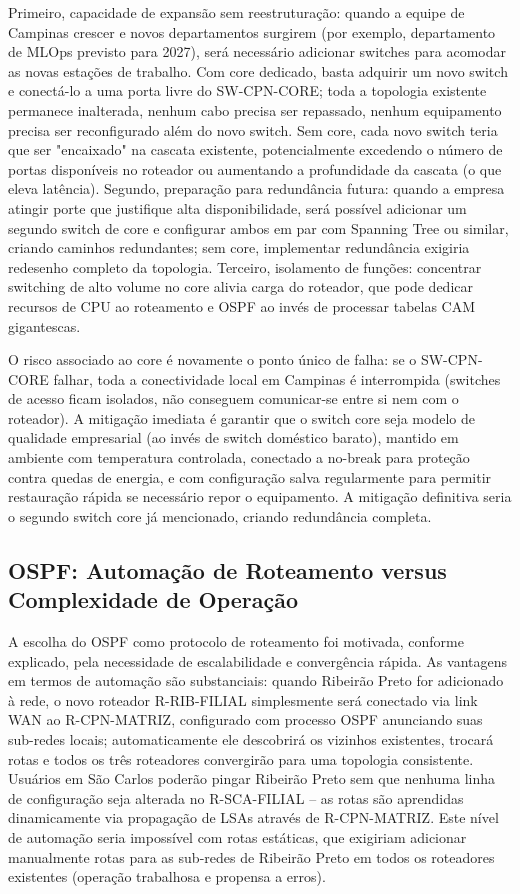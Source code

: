 \documentclass[12pt,a4paper]{article}
\begin{document}
Primeiro, capacidade de expansão sem reestruturação: quando a equipe de Campinas crescer e novos departamentos surgirem (por exemplo, departamento de MLOps previsto para 2027), será necessário adicionar switches para acomodar as novas estações de trabalho. Com core dedicado, basta adquirir um novo switch e conectá-lo a uma porta livre do SW-CPN-CORE; toda a topologia existente permanece inalterada, nenhum cabo precisa ser repassado, nenhum equipamento precisa ser reconfigurado além do novo switch. Sem core, cada novo switch teria que ser "encaixado" na cascata existente, potencialmente excedendo o número de portas disponíveis no roteador ou aumentando a profundidade da cascata (o que eleva latência). Segundo, preparação para redundância futura: quando a empresa atingir porte que justifique alta disponibilidade, será possível adicionar um segundo switch de core e configurar ambos em par com Spanning Tree ou similar, criando caminhos redundantes; sem core, implementar redundância exigiria redesenho completo da topologia. Terceiro, isolamento de funções: concentrar switching de alto volume no core alivia carga do roteador, que pode dedicar recursos de CPU ao roteamento e OSPF ao invés de processar tabelas CAM gigantescas.

O risco associado ao core é novamente o ponto único de falha: se o SW-CPN-CORE falhar, toda a conectividade local em Campinas é interrompida (switches de acesso ficam isolados, não conseguem comunicar-se entre si nem com o roteador). A mitigação imediata é garantir que o switch core seja modelo de qualidade empresarial (ao invés de switch doméstico barato), mantido em ambiente com temperatura controlada, conectado a no-break para proteção contra quedas de energia, e com configuração salva regularmente para permitir restauração rápida se necessário repor o equipamento. A mitigação definitiva seria o segundo switch core já mencionado, criando redundância completa.

\subsection{OSPF: Automação de Roteamento versus Complexidade de Operação}

A escolha do OSPF como protocolo de roteamento foi motivada, conforme explicado, pela necessidade de escalabilidade e convergência rápida. As vantagens em termos de automação são substanciais: quando Ribeirão Preto for adicionado à rede, o novo roteador R-RIB-FILIAL simplesmente será conectado via link WAN ao R-CPN-MATRIZ, configurado com processo OSPF anunciando suas sub-redes locais; automaticamente ele descobrirá os vizinhos existentes, trocará rotas e todos os três roteadores convergirão para uma topologia consistente. Usuários em São Carlos poderão pingar Ribeirão Preto sem que nenhuma linha de configuração seja alterada no R-SCA-FILIAL -- as rotas são aprendidas dinamicamente via propagação de LSAs através de R-CPN-MATRIZ. Este nível de automação seria impossível com rotas estáticas, que exigiriam adicionar manualmente rotas para as sub-redes de Ribeirão Preto em todos os roteadores existentes (operação trabalhosa e propensa a erros).
\end{document}
